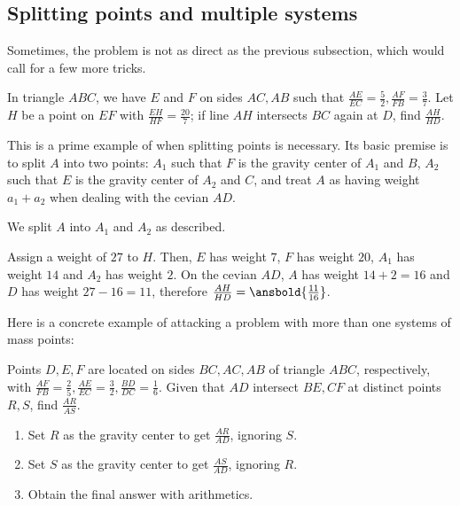 \documentclass[mast]{lucky}
\begin{document}
\subsection{Splitting points and multiple systems}
Sometimes, the problem is not as direct as the previous subsection, which would call for a few more tricks.
\begin{exam}
In triangle $ABC$, we have $E$ and $F$ on sides $AC,AB$ such that $\frac{AE}{EC}=\frac{5}{2},\frac{AF}{FB}=\frac{3}{7}$. Let $H$ be a point on $EF$ with $\frac{EH}{HF}=\frac{20}{7}$; if line $AH$ intersects $BC$ again at $D$, find $\frac{AH}{HD}$.
\end{exam}
This is a prime example of when splitting points is necessary. Its basic premise is to split $A$ into two points: $A_1$ such that $F$ is the gravity center of $A_1$ and $B$, $A_2$ such that $E$ is the gravity center of $A_2$ and $C$, and treat $A$ as having weight $a_1+a_2$ when dealing with the cevian $AD$.
\begin{sol}
We split $A$ into $A_1$ and $A_2$ as described. 

Assign a weight of $27$ to $H$. Then, $E$ has weight $7$, $F$ has weight $20$, $A_1$ has weight $14$ and $A_2$ has weight $2$. On the cevian $AD$, $A$ has weight $14+2=16$ and $D$ has weight $27-16=11$, therefore $\frac{AH}{HD}=\ansbold{\frac{11}{16}}$. 
\end{sol}

\bigskip
\noindent Here is a concrete example of attacking a problem with more than one systems of mass points:
\begin{exam}
Points $D,E,F$ are located on sides $BC,AC,AB$ of triangle $ABC$, respectively, with $\frac{AF}{FB}=\frac{2}{5},\frac{AE}{EC}=\frac{3}{2},\frac{BD}{DC}=\frac{1}{6}$. Given that $AD$ intersect $BE,CF$ at distinct points $R,S$, find $\frac{AR}{AS}$.
\end{exam}

\begin{walk}
\begin{enumerate}
\item Set $R$ as the gravity center to get $\frac{AR}{AD}$, ignoring $S$.
\item Set $S$ as the gravity center to get $\frac{AS}{AD}$, ignoring $R$.
\item Obtain the final answer with arithmetics.
\end{enumerate}
\end{walk}
\end{document}

